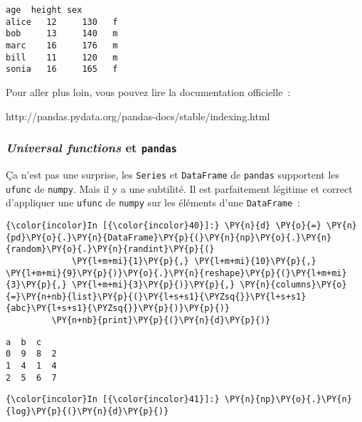     \begin{Verbatim}[commandchars=\\\{\},frame=single,framerule=0.3mm,rulecolor=\color{cellframecolor}]
       age  height sex
alice   12     130   f
bob     13     140   m
marc    16     176   m
bill    11     120   m
sonia   16     165   f
\end{Verbatim}

    Pour aller plus loin, vous pouvez lire la documentation officielle~:

http://pandas.pydata.org/pandas-docs/stable/indexing.html

    \hypertarget{universal-functions-et-pandas}{%
\subsubsection{\texorpdfstring{\emph{Universal functions} et
\texttt{pandas}}{Universal functions et pandas}}\label{universal-functions-et-pandas}}

    Ça n'est pas une surprise, les \texttt{Series} et \texttt{DataFrame} de
\texttt{pandas} supportent les \texttt{ufunc} de \texttt{numpy}. Mais il
y a une subtilité. Il est parfaitement légitime et correct d'appliquer
une \texttt{ufunc} de \texttt{numpy} sur les éléments d'une
\texttt{DataFrame}~:

    \begin{Verbatim}[commandchars=\\\{\},frame=single,framerule=0.3mm,rulecolor=\color{cellframecolor}]
{\color{incolor}In [{\color{incolor}40}]:} \PY{n}{d} \PY{o}{=} \PY{n}{pd}\PY{o}{.}\PY{n}{DataFrame}\PY{p}{(}\PY{n}{np}\PY{o}{.}\PY{n}{random}\PY{o}{.}\PY{n}{randint}\PY{p}{(}
             \PY{l+m+mi}{1}\PY{p}{,} \PY{l+m+mi}{10}\PY{p}{,} \PY{l+m+mi}{9}\PY{p}{)}\PY{o}{.}\PY{n}{reshape}\PY{p}{(}\PY{l+m+mi}{3}\PY{p}{,} \PY{l+m+mi}{3}\PY{p}{)}\PY{p}{,} \PY{n}{columns}\PY{o}{=}\PY{n+nb}{list}\PY{p}{(}\PY{l+s+s1}{\PYZsq{}}\PY{l+s+s1}{abc}\PY{l+s+s1}{\PYZsq{}}\PY{p}{)}\PY{p}{)}
         \PY{n+nb}{print}\PY{p}{(}\PY{n}{d}\PY{p}{)}
\end{Verbatim}


    \begin{Verbatim}[commandchars=\\\{\},frame=single,framerule=0.3mm,rulecolor=\color{cellframecolor}]
   a  b  c
0  9  8  2
1  4  1  4
2  5  6  7
\end{Verbatim}

    \begin{Verbatim}[commandchars=\\\{\},frame=single,framerule=0.3mm,rulecolor=\color{cellframecolor}]
{\color{incolor}In [{\color{incolor}41}]:} \PY{n}{np}\PY{o}{.}\PY{n}{log}\PY{p}{(}\PY{n}{d}\PY{p}{)}
\end{Verbatim}


